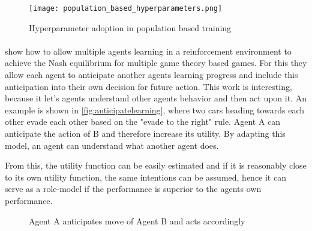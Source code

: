 \documentclass[12pt,a4paper]{article}
\begin{document}
\begin{figure}[] \centering \texttt{[image: population\_based\_hyperparameters.png]}
\caption{Hyperparameter adoption in population based training \cite{jaderberg2017population}}
\label{fig:populationtraining} \end{figure}

\paragraph{\citeauthor{foerster2017learning}} show how to allow multiple agents learning in a reinforcement environment
to achieve the Nash equilibrium for multiple game theory based games. For this they allow each agent to anticipate
another agents learning progress and include this anticipation into their own decision for future action. This work is
interesting, because it let's agents understand other agents behavior and then act upon it. An example is shown in
\autoref{fig:anticipatelearning}, where  two cars heading towards each other evade each other based on the "evade to the
right" rule. Agent A can anticipate the action of B and therefore increase its utility. By adapting this model, an agent
can understand what another agent does.

From this, the utility function can be easily estimated and if it is reasonably close to its own utility function, the
same intentions can be assumed, hence it can serve as a role-model if the performance is superior to the agents own
performance.

\begin{figure}[H] \centering {} \caption{Agent A anticipates move of Agent B and acts accordingly} \label{fig:anticipatelearning}
\end{figure}
\end{document}
